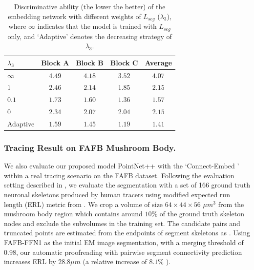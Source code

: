 \begin{table}[t] 
\setlength\tabcolsep{6pt}
\centering
\caption{Discriminative ability (the lower the better) of the embedding network with different weights of $L_{seg}$ ($\lambda_3$), where $\infty$ indicates that the model is trained with $L_{seg}$ only, and `Adaptive' denotes the decreasing strategy of $\lambda_3$. }
\label{ablation}
\begin{tabular}{l|ccc|c}
\hline
$\lambda_3$ & Block A & Block B & Block C & Average \\
 \hline
$\infty$ & $4.49$ & $4.18$ & $3.52$ & $4.07$ \\
$1$ & $2.46$ & $2.14$ & $1.85$ & $2.15$ \\
$0.1$ & $1.73$ & $1.60$ & $1.36$ & $1.57$ \\
$0$ & $2.34$ & $2.07$ & $2.04$ &$2.15$ \\
\hline
Adaptive & $\mathbf{1.59}$ & $\mathbf{1.45}$ & $\mathbf{1.19}$ & $\mathbf{1.41}$ \\
\hline
\end{tabular}
\end{table}
 
\subsubsection{Tracing Result on FAFB Mushroom Body.}
We also evaluate our proposed model PointNet++ with the `Connect-Embed ' within a real tracing scenario on the FAFB dataset. Following the evaluation setting described in \cite{fafb-ffn}, we evaluate the segmentation with a set of 166 ground truth neuronal skeletons produced by human tracers \cite{FAFB} using modified expected run length (ERL) metric from \cite{wei2021axonem}. 
We crop a volume of size $64\times44\times56$ $\mu m^3$ from the mushroom body region which contains around $10\%$ of the ground truth skeleton nodes and exclude the subvolumes in the training set. The candidate pairs and truncated points are estimated from the endpoints of segment skeletons as \cite{matejek2019biologically}. Using FAFB-FFN1 as the initial EM image segmentation, with a merging threshold of $0.98$, our automatic proofreading with pairwise segment connectivity prediction increases ERL by $28.8\mu m$ (a relative increase of $8.1\%$ ). 